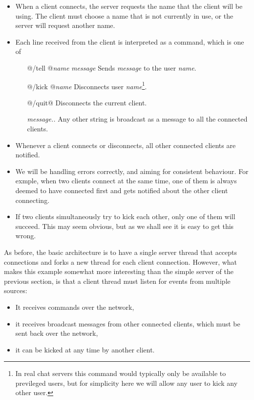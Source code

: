 \begin{itemize}
\item When a client connects, the server requests the name that the
  client will be using.  The client must choose a name that is not
  currently in use, or the server will request another name.

\item Each line received from the client is interpreted as a command,
  which is one of
  \begin{itemize}
    \item [@/tell @\textit{name} \textit{message}] Sends
      \textit{message} to the user \textit{name}.
    \item [@/kick @\textit{name}] Disconnects user
      \textit{name}\footnote{In real chat servers this command would
        typically only be available to previleged users, but for
        simplicity here we will allow any user to kick any other user.}.
    \item [@/quit@] Disconnects the current client.
    \item [\textit{message..}] Any other string is broadcast as a
      message to all the connected clients.
  \end{itemize}

\item Whenever a client connects or disconnects, all other connected
  clients are notified.

\item We will be handling errors correctly, and aiming for consistent
  behaviour.  For exmple, when two clients connect at the same time,
  one of them is always deemed to have connected first and gets
  notified about the other client connecting.

\item If two clients simultaneously try to kick each other, only one
  of them will succeed.  This may seem obvious, but as we shall see it
  is easy to get this wrong.

\end{itemize}


As before, the basic architecture is to have a single server thread
that accepts connections and forks a new thread for each client
connection.  However, what makes this example somewhat more
interesting than the simple server of the previous section, is that a
client thread must listen for events from multiple sources:

\begin{itemize}
\item It receives commands over the network,
\item it receives broadcast messages from other connected clients,
  which must be sent back over the network,
\item it can be kicked at any time by another client.
\end{itemize}

